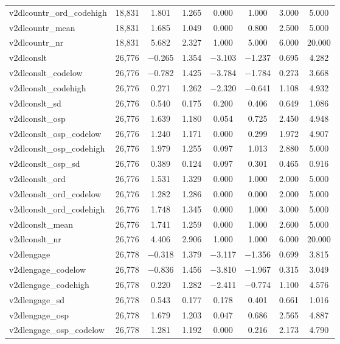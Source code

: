 \begin{table}[!htbp]
\begin{tabular}{@{\extracolsep{5pt}}lccccccc}
v2dlcountr\_ord\_codehigh & 18,831 & 1.801 & 1.265 & 0.000 & 1.000 & 3.000 & 5.000 \\ 
v2dlcountr\_mean & 18,831 & 1.685 & 1.049 & 0.000 & 0.800 & 2.500 & 5.000 \\ 
v2dlcountr\_nr & 18,831 & 5.682 & 2.327 & 1.000 & 5.000 & 6.000 & 20.000 \\ 
v2dlconslt & 26,776 & $-$0.265 & 1.354 & $-$3.103 & $-$1.237 & 0.695 & 4.282 \\ 
v2dlconslt\_codelow & 26,776 & $-$0.782 & 1.425 & $-$3.784 & $-$1.784 & 0.273 & 3.668 \\ 
v2dlconslt\_codehigh & 26,776 & 0.271 & 1.262 & $-$2.320 & $-$0.641 & 1.108 & 4.932 \\ 
v2dlconslt\_sd & 26,776 & 0.540 & 0.175 & 0.200 & 0.406 & 0.649 & 1.086 \\ 
v2dlconslt\_osp & 26,776 & 1.639 & 1.180 & 0.054 & 0.725 & 2.450 & 4.948 \\ 
v2dlconslt\_osp\_codelow & 26,776 & 1.240 & 1.171 & 0.000 & 0.299 & 1.972 & 4.907 \\ 
v2dlconslt\_osp\_codehigh & 26,776 & 1.979 & 1.255 & 0.097 & 1.013 & 2.880 & 5.000 \\ 
v2dlconslt\_osp\_sd & 26,776 & 0.389 & 0.124 & 0.097 & 0.301 & 0.465 & 0.916 \\ 
v2dlconslt\_ord & 26,776 & 1.531 & 1.329 & 0.000 & 1.000 & 2.000 & 5.000 \\ 
v2dlconslt\_ord\_codelow & 26,776 & 1.282 & 1.286 & 0.000 & 0.000 & 2.000 & 5.000 \\ 
v2dlconslt\_ord\_codehigh & 26,776 & 1.748 & 1.345 & 0.000 & 1.000 & 3.000 & 5.000 \\ 
v2dlconslt\_mean & 26,776 & 1.741 & 1.259 & 0.000 & 1.000 & 2.600 & 5.000 \\ 
v2dlconslt\_nr & 26,776 & 4.406 & 2.906 & 1.000 & 1.000 & 6.000 & 20.000 \\ 
v2dlengage & 26,778 & $-$0.318 & 1.379 & $-$3.117 & $-$1.356 & 0.699 & 3.815 \\ 
v2dlengage\_codelow & 26,778 & $-$0.836 & 1.456 & $-$3.810 & $-$1.967 & 0.315 & 3.049 \\ 
v2dlengage\_codehigh & 26,778 & 0.220 & 1.282 & $-$2.411 & $-$0.774 & 1.100 & 4.576 \\ 
v2dlengage\_sd & 26,778 & 0.543 & 0.177 & 0.178 & 0.401 & 0.661 & 1.016 \\ 
v2dlengage\_osp & 26,778 & 1.679 & 1.203 & 0.047 & 0.686 & 2.565 & 4.887 \\ 
v2dlengage\_osp\_codelow & 26,778 & 1.281 & 1.192 & 0.000 & 0.216 & 2.173 & 4.790 \\ 

\end{tabular}
\end{table}
